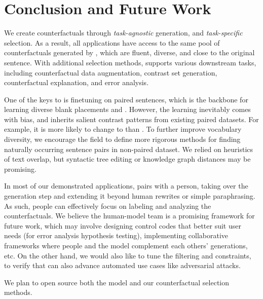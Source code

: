 \section{Conclusion and Future Work}
\label{sec:discuss}

We create counterfactuals through \emph{task-agnostic} generation, and \emph{task-specific} selection.
As a result, all applications have access to the same pool of counterfactuals generated by \sysname, which are fluent, diverse, and close to the original sentence.
With additional selection methods, \sysname supports various downstream tasks, including counterfactual data augmentation, contrast set generation, counterfactual explanation, and error analysis.

One of the keys to \sysname is finetuning on paired sentences, which is the backbone for learning diverse blank placements and \tagstrs.
However, the learning inevitably comes with bias, and \sysname inherits salient contrast patterns from existing paired datasets.
For example, it is more likely to change  to  than .
To further improve vocabulary diversity, we encourage the field to define more rigorous methods for finding naturally occurring sentence pairs in non-paired dataset.
We relied on heuristics of text overlap, but syntactic tree editing or knowledge graph distances may be promising.

In most of our demonstrated applications, \sysname pairs with a person, taking over the generation step and extending it beyond human rewrites or simple paraphrasing. 
As such, people can effectively focus on labeling and analyzing the counterfactuals.
We believe the human-model team is a promising framework for future work, which may involve designing control codes that better suit user needs (\eg for error analysis hypothesis testing), implementing collaborative frameworks where people and the model complement each others' generations, etc.
On the other hand, we would also like to tune the filtering and constraints, to verify that \sysname can also advance automated use cases like adversarial attacks.

We plan to open source both the \sysname model and our counterfactual selection methods.




